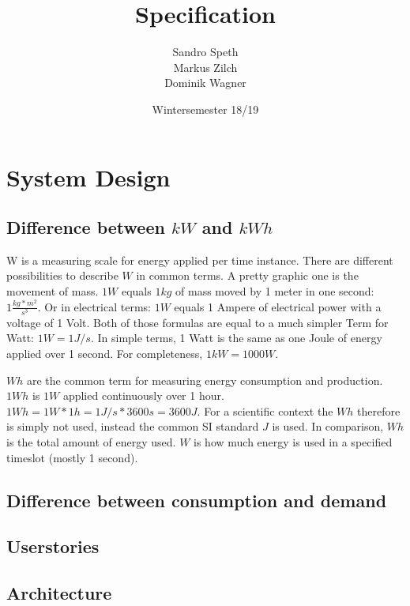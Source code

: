 \documentclass[12pt]{scrartcl}
\title{Specification}
\date{Wintersemester 18/19}
\author{Sandro Speth\\
Markus Zilch\\
Dominik Wagner}
\begin{document}
\maketitle


\section{System Design}\label{sec:systemdesign}

\subsection{Difference between $kW$ and $kWh$}\label{sec:diffEnergy}
W is a measuring scale for energy applied per time instance.
There are different possibilities to describe $W$ in common terms.
A pretty graphic one is the movement of mass.
$1W$ equals $1kg$ of mass moved by 1 meter in one second: $1 \frac{kg*m^2}{s^3}$.
Or in electrical terms: $1W$ equals 1 Ampere of electrical power with a voltage of 1 Volt.
Both of those formulas are equal to a much simpler Term for Watt: $1 W = 1 J/s$.
In simple terms, 1 Watt is the same as one Joule of energy applied over 1 second.
For completeness, $1kW = 1000 W$\cite{Nelson}\cite{Borvon}\cite{SIStandard}.

$Wh$ are the common term for measuring energy consumption and production.
$1Wh$ is $1W$ applied continuously over 1 hour.
$1Wh = 1 W * 1h = 1 J/s * 3600s = 3600J$.
For a scientific context the $Wh$ therefore is simply not used, instead the common SI standard $J$ is used.
In comparison, $Wh$ is the total amount of energy used. $W$ is how much energy is used in a specified timeslot (mostly 1 second)\cite{EURichtlinie}\cite{Bundesgesetz}.


\subsection{Difference between consumption and demand}\label{sec:diffconsumptiondemand}



\subsection{Userstories}\label{sec:userstories}


\subsection{Architecture}






\end{document}
